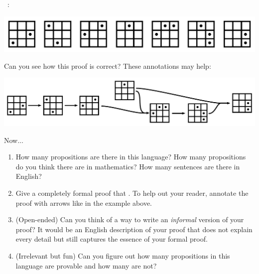 \documentclass[12pt]{article}
\begin{document}
{\ :
\begin{center}
\includegraphics[scale=\s]{img/gridgame/gridgame10.pdf}
\end{center}
Can you see how this proof is correct?
These annotations may help:
\begin{center}
\includegraphics[scale=\s]{img/gridgame/gridgame12.pdf}
\end{center}
Now...
\begin{enumerate}
\item
How many propositions are there in this language?
How many propositions do you think there are in mathematics?
How many sentences are there in English?
\item
Give a completely formal proof that 
.
To help out your reader, annotate the proof with arrows like in the example above.
\item (Open-ended) Can you think of a way to write an \emph{informal} version of your proof?
It would be an English description of your proof that does not explain every detail but still captures the essence of your formal proof.
\item (Irrelevant but fun) Can you figure out how many propositions in this language are provable and how many are not?
\end{enumerate}
}
\end{document}
